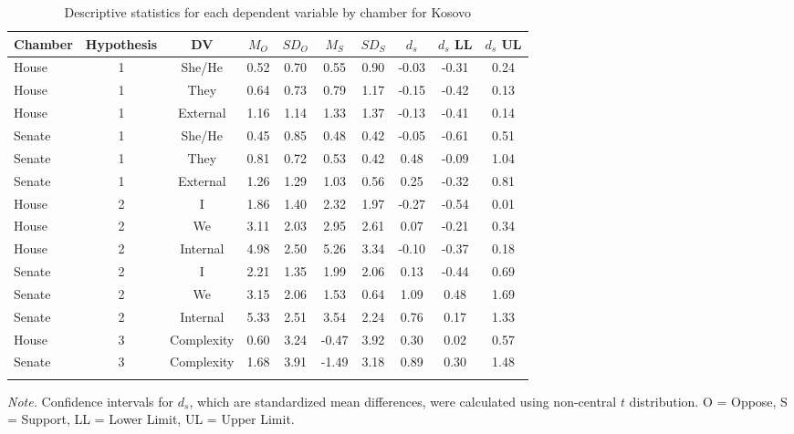 \documentclass[jou,a4paper]{apa6}
\begin{document}
\begin{table}[htbp]

\begin{center}
\begin{threeparttable}

\caption{\label{tab:Ktable}Descriptive statistics for each dependent variable by chamber for Kosovo}

\small{

\begin{tabular}{lccccccccc}
\toprule
Chamber & Hypothesis & DV & $M_O$ & $SD_O$ & $M_S$ & $SD_S$ & $d_s$ & $d_s$ LL & $d_s$ UL\\
\midrule
House & 1 & She/He & 0.52 & 0.70 & 0.55 & 0.90 & -0.03 & -0.31 & 0.24\\
House & 1 & They & 0.64 & 0.73 & 0.79 & 1.17 & -0.15 & -0.42 & 0.13\\
House & 1 & External & 1.16 & 1.14 & 1.33 & 1.37 & -0.13 & -0.41 & 0.14\\
Senate & 1 & She/He & 0.45 & 0.85 & 0.48 & 0.42 & -0.05 & -0.61 & 0.51\\
Senate & 1 & They & 0.81 & 0.72 & 0.53 & 0.42 & 0.48 & -0.09 & 1.04\\
Senate & 1 & External & 1.26 & 1.29 & 1.03 & 0.56 & 0.25 & -0.32 & 0.81\\
House & 2 & I & 1.86 & 1.40 & 2.32 & 1.97 & -0.27 & -0.54 & 0.01\\
House & 2 & We & 3.11 & 2.03 & 2.95 & 2.61 & 0.07 & -0.21 & 0.34\\
House & 2 & Internal & 4.98 & 2.50 & 5.26 & 3.34 & -0.10 & -0.37 & 0.18\\
Senate & 2 & I & 2.21 & 1.35 & 1.99 & 2.06 & 0.13 & -0.44 & 0.69\\
Senate & 2 & We & 3.15 & 2.06 & 1.53 & 0.64 & 1.09 & 0.48 & 1.69\\
Senate & 2 & Internal & 5.33 & 2.51 & 3.54 & 2.24 & 0.76 & 0.17 & 1.33\\
House & 3 & Complexity & 0.60 & 3.24 & -0.47 & 3.92 & 0.30 & 0.02 & 0.57\\
Senate & 3 & Complexity & 1.68 & 3.91 & -1.49 & 3.18 & 0.89 & 0.30 & 1.48\\
\bottomrule
\addlinespace
\end{tabular}

}

\begin{tablenotes}[para]
\normalsize{\textit{Note.} Confidence intervals for $d_s$, which are standardized mean differences, were calculated using non-central $t$ distribution. O = Oppose, S = Support, LL = Lower Limit, UL = Upper Limit.}
\end{tablenotes}

\end{threeparttable}
\end{center}

\end{table}
\end{document}
